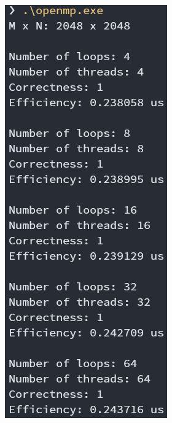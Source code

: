 \documentclass[UTF8, a4paper, 11pt]{article}
\begin{document}
\begin{figure}[H]
\begin{center}
\begin{subfigure}[b]{0.48\linewidth}
\end{subfigure}
\begin{subfigure}[b]{0.48\linewidth}
    \includegraphics[width=\textwidth]{omp2048.png}
\end{subfigure}
\end{center}
\end{figure}
\end{document}
